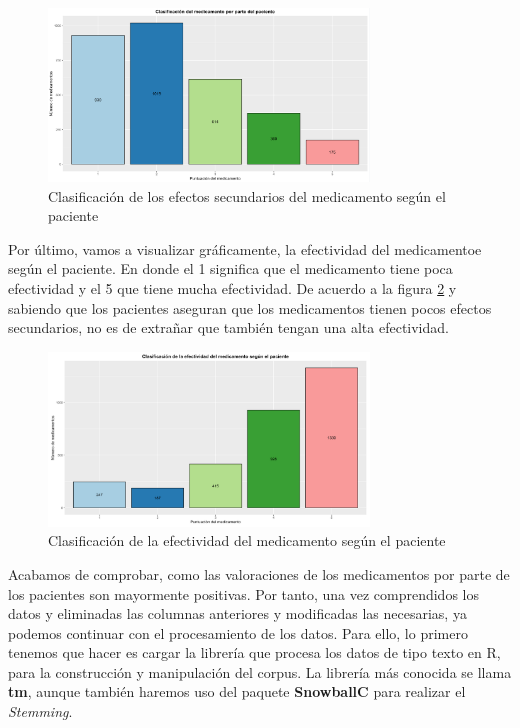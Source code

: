 \documentclass[spanish,]{article}
\begin{document}
\begin{figure}[ht]
    \centering
    \includegraphics[width=0.76\textwidth]{imagenes/grafica_sideEffectsNumber.png}
    \caption{Clasificación de los efectos secundarios del medicamento según el paciente}
    \label{grafica_sideEffectsNumber}
\end{figure}

Por último, vamos a visualizar gráficamente, la efectividad del
medicamentoe según el paciente. En donde el 1 significa que el
medicamento tiene poca efectividad y el 5 que tiene mucha efectividad.
De acuerdo a la figura \ref{grafica_sideEffectsNumber} y sabiendo que
los pacientes aseguran que los medicamentos tienen pocos efectos
secundarios, no es de extrañar que también tengan una alta efectividad.

\begin{figure}[h]
    \centering
    \includegraphics[width=0.76\textwidth]{imagenes/grafica_effectivenessNumber.png}
    \caption{Clasificación de la efectividad del medicamento según el paciente}
    \label{grafica_sideEffectsNumber}
\end{figure}

Acabamos de comprobar, como las valoraciones de los medicamentos por
parte de los pacientes son mayormente positivas. Por tanto, una vez
comprendidos los datos y eliminadas las columnas anteriores y
modificadas las necesarias, ya podemos continuar con el procesamiento de
los datos. Para ello, lo primero tenemos que hacer es cargar la librería
que procesa los datos de tipo texto en R, para la construcción y
manipulación del corpus. La librería más conocida se llama \textbf{tm},
aunque también haremos uso del paquete \textbf{SnowballC} para realizar
el \emph{Stemming}.
\end{document}

